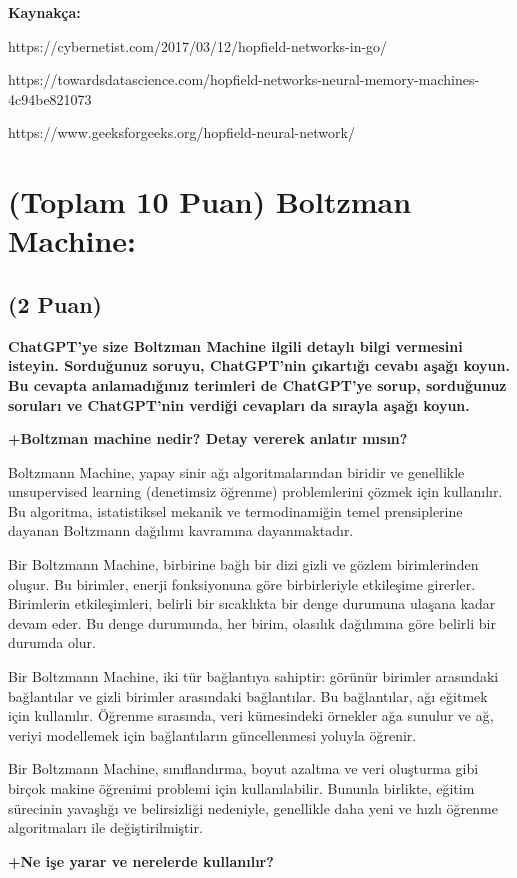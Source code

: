 \documentclass[11pt]{article}
\begin{document}
\textbf{Kaynakça:}

https://cybernetist.com/2017/03/12/hopfield-networks-in-go/

https://towardsdatascience.com/hopfield-networks-neural-memory-machines-4c94be821073

https://www.geeksforgeeks.org/hopfield-neural-network/


\section{(Toplam 10 Puan) Boltzman Machine:}

\subsection{(2 Puan)} \textbf{ChatGPT’ye size Boltzman Machine ilgili detaylı bilgi vermesini isteyin. Sorduğunuz soruyu, ChatGPT'nin çıkartığı cevabı aşağı koyun. Bu cevapta anlamadığınız terimleri de ChatGPT’ye sorup, sorduğunuz soruları ve ChatGPT’nin verdiği cevapları da sırayla aşağı koyun.}

\textbf{+Boltzman machine nedir? Detay vererek anlatır mısın?}

Boltzmann Machine, yapay sinir ağı algoritmalarından biridir ve genellikle unsupervised learning (denetimsiz öğrenme) problemlerini çözmek için kullanılır. Bu algoritma, istatistiksel mekanik ve termodinamiğin temel prensiplerine dayanan Boltzmann dağılımı kavramına dayanmaktadır.

Bir Boltzmann Machine, birbirine bağlı bir dizi gizli ve gözlem birimlerinden oluşur. Bu birimler, enerji fonksiyonuna göre birbirleriyle etkileşime girerler. Birimlerin etkileşimleri, belirli bir sıcaklıkta bir denge durumuna ulaşana kadar devam eder. Bu denge durumunda, her birim, olasılık dağılımına göre belirli bir durumda olur.

Bir Boltzmann Machine, iki tür bağlantıya sahiptir: görünür birimler arasındaki bağlantılar ve gizli birimler arasındaki bağlantılar. Bu bağlantılar, ağı eğitmek için kullanılır. Öğrenme sırasında, veri kümesindeki örnekler ağa sunulur ve ağ, veriyi modellemek için bağlantıların güncellenmesi yoluyla öğrenir.

Bir Boltzmann Machine, sınıflandırma, boyut azaltma ve veri oluşturma gibi birçok makine öğrenimi problemi için kullanılabilir. Bununla birlikte, eğitim sürecinin yavaşlığı ve belirsizliği nedeniyle, genellikle daha yeni ve hızlı öğrenme algoritmaları ile değiştirilmiştir.

\textbf{+Ne işe yarar ve nerelerde kullanılır?}
\end{document}
